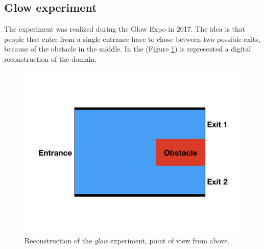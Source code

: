 \documentclass[class=article, crop=false]{standalone}
\begin{document}


\subsection{Glow experiment}
The experiment was realized during the Glow Expo in 2017.
The idea is that people that enter from a single entrance have to chose between two possible exits, because of the obstacle in the middle.
In the (Figure \ref{glow}) is represented a digital reconstruction of the domain.
\begin{figure}[h]
\centering
\includegraphics[width=0.3\textheight]{imgs/glow.png}
\caption{Reconstruction of the \emph{glow} experiment, point of view from above.}
\label{glow}
\end{figure}
\end{document}
